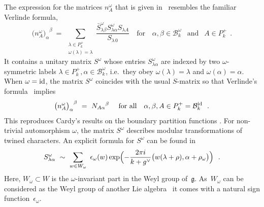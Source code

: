 \documentclass[12pt,a4paper]{article}
\newcommand{\mf}{\mathfrak} %
\newcommand{\mc}{\mathcal} %
\def\bL{\mc{B}} %
\def\areps{P_k^+} %
\def\tareps{\bL^\omega_k} %
\def\om{\omega}
\def\id{{\rm id}}
\def\a{\alpha}
\def\b{\beta}
\begin{document}
The expression for the matrices $n_A^\omega$ that is given 
in~\cite{Birke:1999ik, Fuchs:1999zi} resembles the familiar 
Verlinde formula,  
\begin{equation}
  \label{annuluscf}
  {\bigl(n_A^\omega\bigr)_\alpha}^\beta \ = \ 
\sum_{\substack{\lambda\in\areps\\\omega(\lambda)=\lambda}}
\frac{\bar{S}^{\omega}_{\lambda\beta}S^{\omega}_{\lambda \alpha}
S_{\lambda A }}{S_{\lambda\, 0}} \ \ \ \text{ for } \ \ \  
\a,\b \in \bL^\om_k \ \ \text{ and } \ \ A \in\areps\ \ .  
\end{equation}
It contains a unitary matrix $S^{\omega}$ whose entries  
$S^\om_{\lambda \a}$ are indexed by two $\omega$-symmetric labels 
$\lambda\in\areps, \alpha\in\tareps$, i.e.\ they obey $\omega(\lambda)= 
\lambda$ and $\omega(\a)=\a$. When $\om = \id$, the matrix $S^\om$
coincides with the usual $S$-matrix so that Verlinde's 
formula~\cite{Verlinde:1988sn} implies  
$$ {\bigl(n_A^\omega\bigr)_\alpha}^\beta \ = \ 
{N_{A \a}}^{\b} \ \ \ \text{ for all }
   \ \ \a,\b,A\in\areps=\bL_k^\id\ \ .$$
This reproduces Cardy's results on the boundary partition
functions \cite{Cardy:1989ir}. For non-trivial automorphism $\om$, 
the matrix $S^\om$ describes modular transformations of 
twined characters. An explicit formula for $S^\om$ can be
found in~\cite{Birke:1999ik}
\begin{equation}
  S_{\lambda\alpha}^\omega \ \sim\ \sum_{w\in W_\omega}\ 
  \epsilon_\omega(w) \exp\Bigl(-\frac{2\pi i}{k+g^\vee}
  \bigl(w(\lambda+\rho),\alpha+\rho_\omega\bigr)\Bigr)\ \ .
\end{equation}
Here, $W_\omega \subset W$ is the $\omega$-invariant part in the Weyl group
of~$\mf{g}$. As~$W_\omega$ can be considered as the Weyl group of another
Lie algebra~\cite{Fuchs:1996zr} it comes with a natural sign
function~$\epsilon_\om$.    
\medskip 
\end{document}
